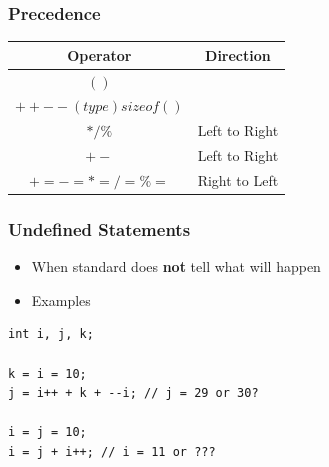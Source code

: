 \documentclass{../c-lecture}
\begin{document}
\begin{frame}
  \frametitle{Precedence}
  \begin{table}
  \begin{tabular}{cc}
    \toprule

    Operator &
    Direction \\

    \midrule

    $( )$&
    \\

    \midrule

    $++ -- (type) sizeof()$ &
    \\

    \midrule

    $* / \%$ &
    Left to Right \\

    \midrule

    $+ -$ &
    Left to Right \\

    \midrule

    $+= -= *= /= \%=$ &
    Right to Left \\

    \bottomrule
  \end{tabular}
  \end{table}
\end{frame}

\begin{frame}[fragile]
  \frametitle{Undefined Statements}
  \begin{itemize}
    \item
      When standard does \textbf{\color{RubineRed} not} tell what will
      happen
    \item Examples
  \end{itemize}
  \begin{verbatim}
int i, j, k;

k = i = 10;
j = i++ + k + --i; // j = 29 or 30?

i = j = 10;
i = j + i++; // i = 11 or ???
  \end{verbatim}
\end{frame}
\end{document}
